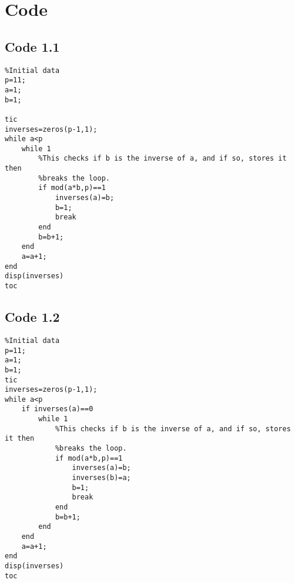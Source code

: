 \documentclass[10pt,a4paper,notitlepage]{article}
\begin{document}
\section*{\centering Code}
\subsection*{\centering\normalsize Code 1.1} \label{subsec:Code 1.1}
\begin{verbatim}
%Initial data
p=11;
a=1;
b=1;

tic
inverses=zeros(p-1,1);
while a<p
    while 1
        %This checks if b is the inverse of a, and if so, stores it then
        %breaks the loop.
        if mod(a*b,p)==1
            inverses(a)=b;
            b=1;
            break
        end
        b=b+1;
    end
    a=a+1;
end
disp(inverses)
toc
\end{verbatim}
\pagebreak
\subsection*{\centering\normalsize Code 1.2}\label{subsec:Code 1.2}
\begin{verbatim}
%Initial data
p=11;
a=1;
b=1;
tic
inverses=zeros(p-1,1);
while a<p
    if inverses(a)==0
        while 1
            %This checks if b is the inverse of a, and if so, stores it then
            %breaks the loop.
            if mod(a*b,p)==1
                inverses(a)=b;
                inverses(b)=a;
                b=1;
                break
            end
            b=b+1;
        end
    end
    a=a+1;
end
disp(inverses)
toc
\end{verbatim}
\pagebreak
\end{document}
